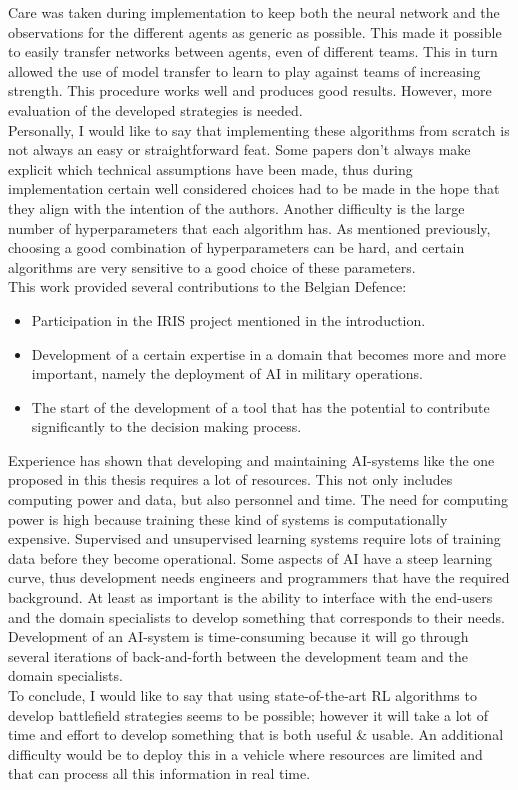 Care was taken during implementation to keep both the neural network and the observations for the different agents as generic as possible. This made it possible to easily transfer networks between agents, even of different teams. This in turn allowed the use of model transfer to learn to play against teams of increasing strength. This procedure works well and produces good results. However, more evaluation of the developed strategies is needed.\\
Personally, I would like to say that implementing these algorithms from scratch is not always an easy or straightforward feat. Some papers don't always make explicit which technical assumptions have been made, thus during implementation certain well considered choices had to be made in the hope that they align with the intention of the authors. Another difficulty is the large number of hyperparameters that each algorithm has. As mentioned previously, choosing a good combination of hyperparameters can be hard, and certain algorithms are very sensitive to a good choice of these parameters.\\
This work provided several contributions to the Belgian Defence:
\begin{itemize}
    \item Participation in the IRIS project mentioned in the introduction.
    \item Development of a certain expertise in a domain that becomes more and more important, namely the deployment of AI in military operations.
    \item The start of the development of a tool that has the potential to contribute significantly to the decision making process.
\end{itemize}
Experience has shown that developing and maintaining AI-systems like the one proposed in this thesis requires a lot of resources. This not only includes computing power and data, but also personnel and time. The need for computing power is high because training these kind of systems is computationally expensive. Supervised and unsupervised learning systems require lots of training data before they become operational.
Some aspects of AI have a steep learning curve, thus development needs engineers and programmers that have the required background. At least as important is the ability to interface with the end-users and the domain specialists to develop something that corresponds to their needs. Development of an AI-system is time-consuming because it will go through several iterations of back-and-forth between the development team and the domain specialists.\\
To conclude, I would like to say that using state-of-the-art RL algorithms to develop battlefield strategies seems to be possible; however it will take a lot of time and effort to develop something that is both useful \& usable. An additional difficulty would be to deploy this in a vehicle where resources are limited and that can process all this information in real time.